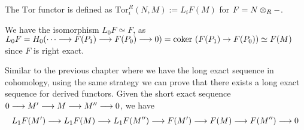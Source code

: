 \documentclass{article}
\begin{document}
\begin{definition}
    The $\mathrm{Tor}$ functor is defined as $\mathrm{Tor}_i^R(N, M) := L_i F(M)$ for $F = N \otimes_R -$.
\end{definition}

\begin{remark}
    We have the isomorphism $L_0 F \simeq F$, as $L_0 F = H_0(\cdots \longrightarrow F(P_1) \longrightarrow F(P_0) \longrightarrow 0) = \mathrm{coker}\ (F(P_1) \to F(P_0)) \simeq F(M)$ since $F$ is right exact. 
\end{remark}

\begin{remark}
    Similar to the previous chapter where we have the long exact sequence in cohomology, using the same strategy we can prove that there exists a long exact sequence for derived functors. Given the short exact sequence $0 \longrightarrow M' \longrightarrow M \longrightarrow M'' \longrightarrow 0$, we have
    \[
        L_1F(M') \longrightarrow L_1F(M) \longrightarrow L_1F(M'') \longrightarrow F(M') \longrightarrow F(M) \longrightarrow F(M'') \longrightarrow 0
    \]
\end{remark}
\end{document}
